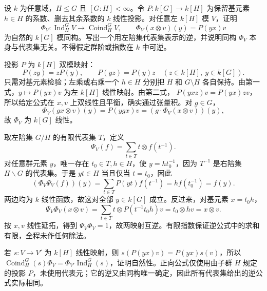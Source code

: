 \begin{optionalexercise}\label{b4:ex:03-finite-index-ind-coind}
	设 \(k\) 为任意域，\(H\le G\) 且 \([G:H]<\infty\)。令 \(P:k[G]\rightarrow k[H]\) 为保留基元素 \(h\in H\) 的系数、删去其余系数的 \(k\) 线性投影。对任意左 \(k[H]\) 模 \(V\)，证明
	\[
		\Phi_V:\operatorname{Ind}^G_H V\longrightarrow\operatorname{Coind}^G_H V,
		\qquad
		\Phi_V(x\otimes v)(y)=P(yx)v
	\]
	为自然的 \(k[G]\) 模同构。写出一个用左陪集代表集表示的逆，并说明同构 \(\Phi_V\) 本身与代表集无关。不得假定群阶或指数在 \(k\) 中可逆。
\end{optionalexercise}
\begin{solution}
	投影 \(P\) 为 \(k[H]\) 双模映射：
	\[
		P(zy)=zP(y),\qquad P(yz)=P(y)z
		\quad(z\in k[H],\ y\in k[G]).
	\]
	只需对基元素检验；左乘或右乘一个 \(h\in H\) 分别把 \(H\) 和 \(G\setminus H\) 各自保持。由第一式，\(y\mapsto P(yx)v\) 为左 \(k[H]\) 线性映射。由第二式，
	\(P(yxz)v=P(yx)zv\)，所以给定公式在 \(x,v\) 上双线性且平衡，确实通过张量积。对 \(g\in G\)，
	\[
		\Phi_V(gx\otimes v)(y)
		=P(ygx)v
		=(g\cdot\Phi_V(x\otimes v))(y),
	\]
	故 \(\Phi_V\) 为 \(k[G]\) 线性。

	取左陪集 \(G/H\) 的有限代表集 \(T\)，定义
	\[
		\Psi_V(f)=\sum_{t\in T}t\otimes f(t^{-1}).
	\]
	对任意群元素 \(y\)，唯一存在 \(t_0\in T,h\in H\)，使 \(y=ht_0^{-1}\)，因为 \(T^{-1}\) 是右陪集 \(H\backslash G\) 的代表集。于是 \(yt\in H\) 当且仅当 \(t=t_0\)，因此
	\[
		(\Phi_V\Psi_V(f))(y)
		=\sum_{t\in T}P(yt)f(t^{-1})
		=h f(t_0^{-1})=f(y).
	\]
	两边均为 \(k\) 线性函数，故这对全部 \(y\in k[G]\) 成立。反过来，对基元素 \(x=t_0h\)，
	\[
		\Psi_V\Phi_V(x\otimes v)
		=\sum_{t\in T}t\otimes P(t^{-1}t_0h)v
		=t_0\otimes hv=x\otimes v.
	\]
	按 \(x,v\) 线性延拓，得到 \(\Psi_V\Phi_V=1\)，故两映射互逆。有限指数保证逆公式中的求和有限，全程未作任何除法。

	若 \(s:V\rightarrow V'\) 为 \(k[H]\) 线性映射，则
	\(s(P(yx)v)=P(yx)s(v)\)，所以
	\(\operatorname{Coind}^G_H(s)\Phi_V=\Phi_{V'}\operatorname{Ind}^G_H(s)\)，证明自然性。正向公式仅使用由子群 \(H\) 规定的投影 \(P\)，未使用代表元；它的逆又由同构唯一确定，因此所有代表集给出的逆公式实际相同。
\end{solution}

